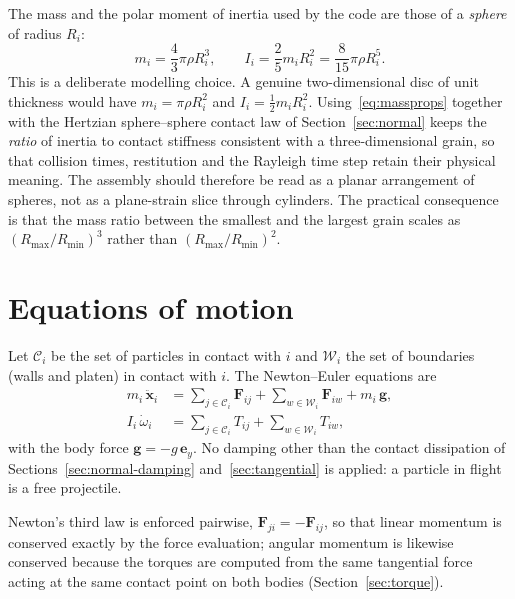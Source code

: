 The mass and the polar moment of inertia used by the code are those of a
\emph{sphere} of radius $R_{i}$:
\begin{equation}
  m_{i} = \frac{4}{3}\pi\rho R_{i}^{3},
  \qquad
  I_{i} = \frac{2}{5} m_{i} R_{i}^{2}
        = \frac{8}{15}\pi\rho R_{i}^{5}.
  \label{eq:massprops}
\end{equation}
This is a deliberate modelling choice.  A genuine two-dimensional disc of unit
thickness would have $m_{i}=\pi\rho R_{i}^{2}$ and $I_{i}=\tfrac{1}{2}m_{i}R_{i}^{2}$.
Using~\eqref{eq:massprops} together with the Hertzian sphere--sphere contact law
of Section~\ref{sec:normal} keeps the \emph{ratio} of inertia to contact
stiffness consistent with a three-dimensional grain, so that collision times,
restitution and the Rayleigh time step retain their physical meaning.  The
assembly should therefore be read as a planar arrangement of spheres, not as a
plane-strain slice through cylinders.  The practical consequence is that the
mass ratio between the smallest and the largest grain scales as
$(R_{\max}/R_{\min})^{3}$ rather than $(R_{\max}/R_{\min})^{2}$.

\section{Equations of motion}
\label{sec:eom}

Let $\mathcal{C}_{i}$ be the set of particles in contact with $i$ and
$\mathcal{W}_{i}$ the set of boundaries (walls and platen) in contact with $i$.
The Newton--Euler equations are
\begin{align}
  m_{i}\,\ddot{\mathbf{x}}_{i}
    &= \sum_{j\in\mathcal{C}_{i}} \mathbf{F}_{ij}
     + \sum_{w\in\mathcal{W}_{i}} \mathbf{F}_{iw}
     + m_{i}\,\mathbf{g},
     \label{eq:newton}\\[2pt]
  I_{i}\,\dot{\omega}_{i}
    &= \sum_{j\in\mathcal{C}_{i}} T_{ij}
     + \sum_{w\in\mathcal{W}_{i}} T_{iw},
     \label{eq:euler}
\end{align}
with the body force $\mathbf{g}=-g\,\mathbf{e}_{y}$.  No damping other than the
contact dissipation of Sections~\ref{sec:normal-damping}
and~\ref{sec:tangential} is applied: a particle in flight is a free projectile.

Newton's third law is enforced pairwise,
$\mathbf{F}_{ji}=-\mathbf{F}_{ij}$, so that linear momentum is conserved exactly
by the force evaluation; angular momentum is likewise conserved because the
torques are computed from the same tangential force acting at the same contact
point on both bodies (Section~\ref{sec:torque}).

